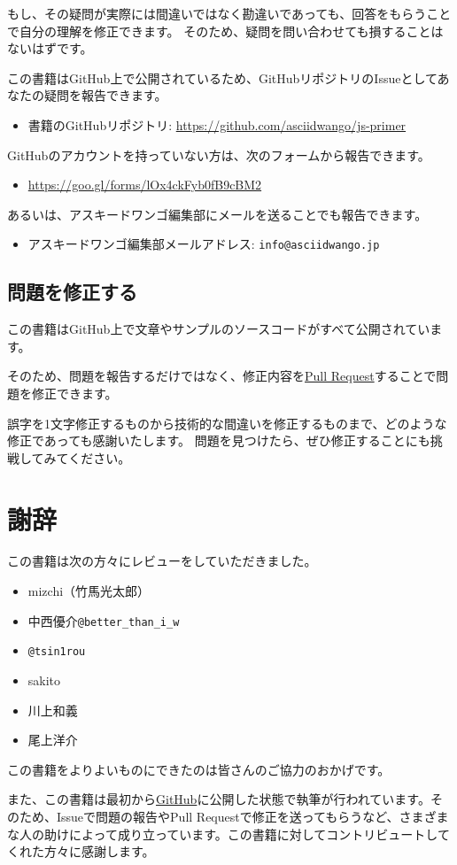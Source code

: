 もし、その疑問が実際には間違いではなく勘違いであっても、回答をもらうことで自分の理解を修正できます。
そのため、疑問を問い合わせても損することはないはずです。

この書籍はGitHub上で公開されているため、GitHubリポジトリのIssueとしてあなたの疑問を報告できます。

\begin{itemize}
\item 書籍のGitHubリポジトリ: \url{https://github.com/asciidwango/js-primer}
\end{itemize}

GitHubのアカウントを持っていない方は、次のフォームから報告できます。
\begin{itemize}
\item \url{https://goo.gl/forms/lOx4ckFyb0fB9cBM2}
\end{itemize}

あるいは、アスキードワンゴ編集部にメールを送ることでも報告できます。
\begin{itemize}
\item アスキードワンゴ編集部メールアドレス: \texttt{info@asciidwango.jp}
\end{itemize}

\hypertarget{pull-request}{%
\subsection*{問題を修正する}\label{pull-request}}

この書籍はGitHub上で文章やサンプルのソースコードがすべて公開されています。

そのため、問題を報告するだけではなく、修正内容を\href{https://help.github.com/articles/about-pull-requests/}{Pull
Request}することで問題を修正できます。

誤字を1文字修正するものから技術的な間違いを修正するものまで、どのような修正であっても感謝いたします。
問題を見つけたら、ぜひ修正することにも挑戦してみてください。

\hypertarget{thanks}{%
\section*{謝辞}\label{thanks}}

この書籍は次の方々にレビューをしていただきました。

\begin{itemize}
\item mizchi（竹馬光太郎）
\item 中西優介\texttt{@better\_than\_i\_w}
\item \texttt{@tsin1rou}
\item sakito
\item 川上和義
\item 尾上洋介
\end{itemize}

この書籍をよりよいものにできたのは皆さんのご協力のおかげです。

また、この書籍は最初から\href{https://github.com/asciidwango/js-primer}{GitHub}に公開した状態で執筆が行われています。そのため、Issueで問題の報告やPull Requestで修正を送ってもらうなど、さまざまな人の助けによって成り立っています。この書籍に対してコントリビュートしてくれた方々に感謝します。
